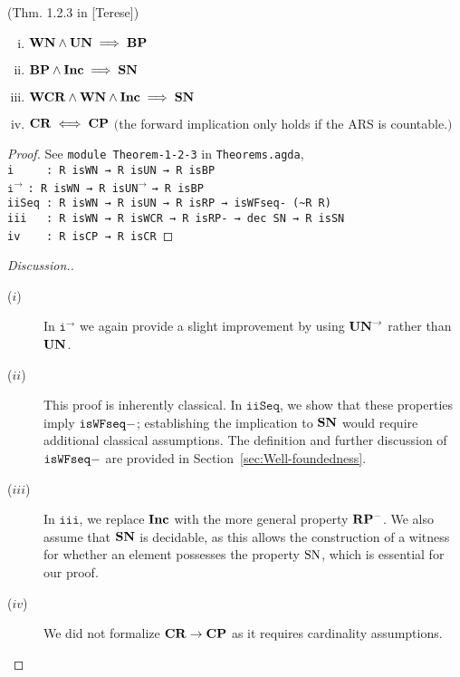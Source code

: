 \begin{theorem}(Thm. 1.2.3 in [Terese])
  \begin{enumerate}[(i)]
    \item $\mathbf{WN} \land \mathbf{UN} \implies \mathbf{BP}$
    \item $\mathbf{BP} \land \mathbf{Inc} \implies \mathbf{SN}$
    \item $\mathbf{WCR} \land \mathbf{WN} \land \mathbf{Inc} \implies \mathbf{SN}$
    \item $\mathbf{CR} \iff \mathbf{CP}$ $($the forward implication only holds if the ARS is countable.$)$
  \end{enumerate}
\end{theorem}

\begin{proof}
    See \texttt{module Theorem-1-2-3} in \texttt{Theorems.agda},\\
    \verb|i     : R isWN → R isUN → R isBP|\\
    $\mathtt{i^\to}$\hspace{5mm} \verb|: R isWN → R |\texttt{isUN}$^{\to}$ \verb|→ R isBP|\\
    \verb|iiSeq : R isWN → R isUN → R isRP → isWFseq- (~R R)|\\
    \verb|iii   : R isWN → R isWCR → R isRP- → dec SN → R isSN|\\
    \verb|iv    : R isCP → R isCR|
\end{proof}
\begin{proof}[Discussion.]\hfill
  \begin{description}
    \item[($i$)] In $\mathtt{i^\to}$ we again provide a slight improvement by using $\mathbf{UN}^{\to}$ rather than $\mathbf{UN}$.
    \item[($ii$)] This proof is inherently classical. In $\mathtt{iiSeq}$, we show that these properties imply $\mathtt{isWFseq-}$; establishing the implication to $\mathbf{SN}$ would require additional classical assumptions. The definition and further discussion of $\mathtt{isWFseq-}$ are provided in Section~\ref{sec:Well-foundedness}.
    \item[($iii$)] In $\mathtt{iii}$, we replace $\mathbf{Inc}$ with the more general property $\mathbf{RP^{-}}$. We also assume that $\mathbf{SN}$ is decidable, as this allows the construction of a witness for whether an element possesses the property $\mathrm{SN}$, which is essential for our proof.
    \item[($iv$)] We did not formalize $\mathbf{CR} \to \mathbf{CP}$ as it requires cardinality assumptions. \qedhere
  \end{description}
\end{proof}

